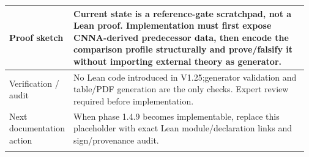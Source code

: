 \begin{longtable}{L{0.16\linewidth} L{0.81\linewidth}}
\hline\addlinespace[0.20em]
Proof sketch & Current state is a reference-gate scratchpad, not a Lean proof. Implementation must first expose CNNA-derived predecessor data, then encode the comparison profile structurally and prove/\allowbreak{}falsify it without importing external theory as generator.\\
\hline\addlinespace[0.20em]
Verification /\allowbreak{} audit & No Lean code introduced in V1.25;\newline generator validation and table/\allowbreak{}PDF generation are the only checks. Expert review required before implementation.\\
\hline\addlinespace[0.20em]
Next documentation action & When phase 1.4.9 becomes implementable, replace this placeholder with exact Lean module/\allowbreak{}declaration links and sign/\allowbreak{}provenance audit.\\
\hline\addlinespace[0.20em]
\end{longtable}
